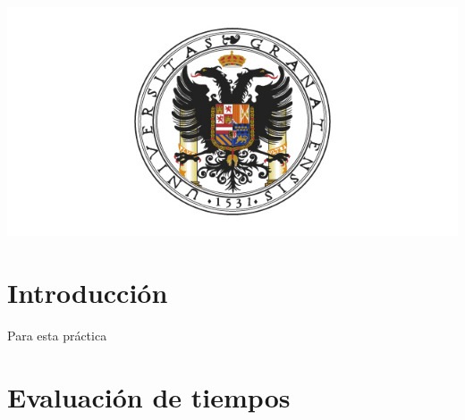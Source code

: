 \includegraphics[width=1\linewidth]{ugr}

\newpage %

\tableofcontents %



\newpage


\section*{Introducción}

Para esta práctica 


\section{Evaluación de tiempos}


